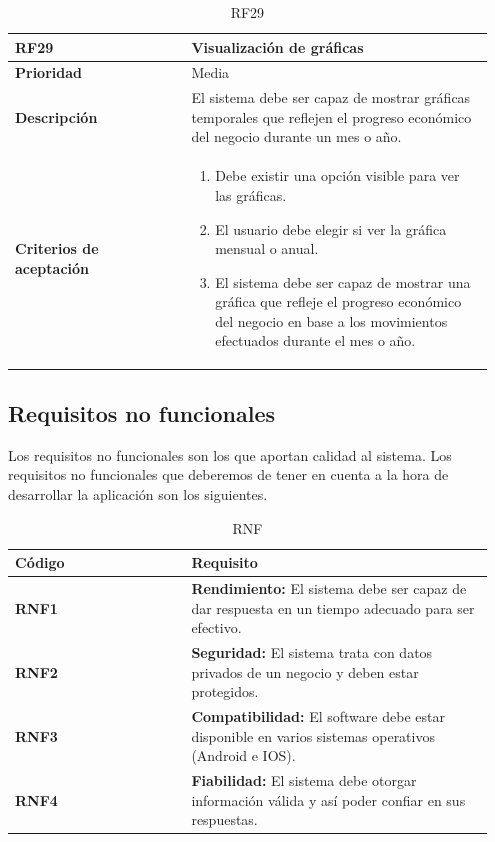 \begin{table}[H]
	\centering %
	\begin{tabular}{|p{0.35\linewidth}|p{0.6\linewidth}|}
		\hline
		\rowcolor{grayshade} \textbf{RF29} & \textbf{Visualización de gráficas} \\
		\hline
		\textbf{Prioridad} & Media \\
		\hline
		\textbf{Descripción} & El sistema debe ser capaz de mostrar gráficas temporales que reflejen el progreso económico del negocio durante un mes o año.\\
		\hline
		\vspace{0.5mm}
		\textbf{Criterios de aceptación} & 
		\begin{minipage}[t]{0.9\linewidth}
			\begin{enumerate}
				\item Debe existir una opción visible para ver las gráficas.
				\item El usuario debe elegir si ver la gráfica mensual o anual. 
				\item El sistema debe ser capaz de mostrar una gráfica que refleje el progreso económico del negocio en base a los movimientos efectuados durante el mes o año.   
			\end{enumerate}
			\vspace{2mm}
		\end{minipage} \\
		\hline
	\end{tabular}
	\caption{RF29}
\end{table}


\newpage

\subsection{Requisitos no funcionales}

Los requisitos no funcionales son los que aportan calidad al sistema. Los requisitos no funcionales que deberemos de tener en cuenta a la hora de desarrollar la aplicación son los siguientes. 

\begin{table}[h]
	\centering
	\begin{tabular}{|p{0.35\linewidth}|p{0.6\linewidth}|}
		\hline
		\rowcolor{grayshade} \textbf{Código} & \textbf{Requisito} \\
		\hline
		\textbf{RNF1} & \textbf{Rendimiento:} El sistema debe ser capaz de dar respuesta en un tiempo adecuado para ser efectivo.  \\
		\hline
		\textbf{RNF2} & \textbf{Seguridad:} El sistema trata con datos privados de un negocio y deben estar protegidos.  \\
		\hline
		\textbf{RNF3} & \textbf{Compatibilidad:} El software debe estar disponible en varios sistemas operativos (Android e IOS). \\
		\hline
		\textbf{RNF4} & \textbf{Fiabilidad:} El sistema debe otorgar información válida y así poder confiar en sus respuestas.  \\
		\hline
	\end{tabular}
	\caption{RNF}
\end{table}

